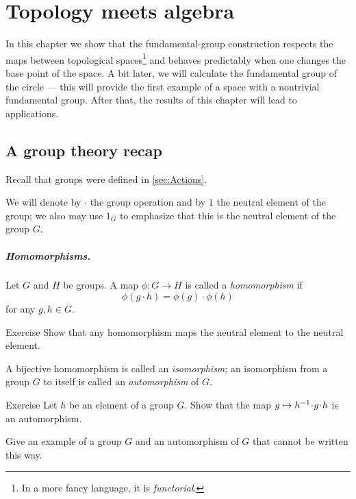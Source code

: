 \chapter{Topology meets algebra}\label{chap:algebra}

In this chapter we show that the fundamental-group construction respects the maps between topological spaces\footnote{In a more fancy language, it is \emph{functorial}.} and behaves predictably when one changes the base point of the space.
A bit later, we will calculate the fundamental group of the circle --- this will provide the first example of a space with a nontrivial fundamental group.
After that, the results of this chapter will lead to applications.

\section{A group theory recap}\label{sec:a bit of group theory}

Recall that groups were defined in \ref{sec:Actions}.

We will denote by $\cdot$ the group operation and by $1$ the neutral element of the group; we also may use $1_G$ to emphasize that this is the neutral element of the group $G$.

\paragraph{Homomorphisms.}
Let $G$ and $H$ be groups.
A map $\phi\colon G\to H$ is called a
\emph{homomorphism} if
\[
\phi(g\cdot h)=\phi(g)\cdot \phi(h)
\]
for any $g,h\in G$.

\begin{thm}{Exercise}\label{ex:homomorphism}
Show that any homomorphism maps the neutral element to the neutral element.
\end{thm}

A bijective homomorphism is called an
\emph{isomorphism};
an isomorphism from a group $G$ to itself is called an
\emph{automorphism} of $G$.

\begin{thm}{Exercise}\label{ex:inner}
Let $h$ be an element of a group $G$.
Show that the map $g\z\mapsto h^{-1}\cdot g\cdot h$ is an automorphism.

Give an example of a group $G$ and an automorphism of $G$ that cannot be written this way.
\end{thm}

